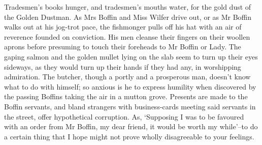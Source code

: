 Tradesmen’s books hunger, and tradesmen’s mouths water, for the gold
dust of the Golden Dustman. As Mrs Boffin and Miss Wilfer drive out, or
as Mr Boffin walks out at his jog-trot pace, the fishmonger pulls off
his hat with an air of reverence founded on conviction. His men cleanse
their fingers on their woollen aprons before presuming to touch their
foreheads to Mr Boffin or Lady. The gaping salmon and the golden mullet
lying on the slab seem to turn up their eyes sideways, as they would
turn up their hands if they had any, in worshipping admiration. The
butcher, though a portly and a prosperous man, doesn’t know what to do
with himself; so anxious is he to express humility when discovered by
the passing Boffins taking the air in a mutton grove. Presents are made
to the Boffin servants, and bland strangers with business-cards
meeting said servants in the street, offer hypothetical corruption. As,
‘Supposing I was to be favoured with an order from Mr Boffin, my dear
friend, it would be worth my while’--to do a certain thing that I hope
might not prove wholly disagreeable to your feelings.

